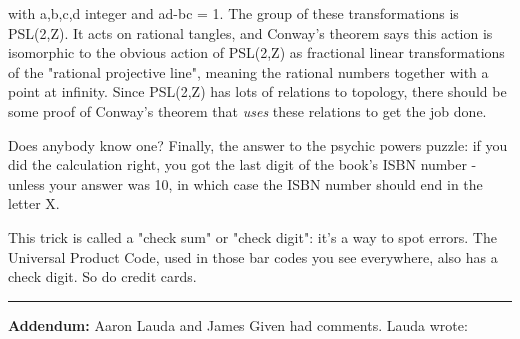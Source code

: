 with a,b,c,d integer and ad-bc = 1.  The group of these transformations
is PSL(2,Z).  It acts on rational tangles, and Conway's theorem says
this action is isomorphic to the obvious action of PSL(2,Z) as fractional
linear transformations of the "rational projective line", 
meaning the rational 
numbers together with a point at infinity.  Since PSL(2,Z) has lots of 
relations to topology, there should be some proof of Conway's theorem
that \emph{uses} these relations to get the job done.

Does anybody know one?
Finally, the answer to the psychic powers puzzle: if you did the 
calculation right, you got the last digit of the book's ISBN number - 
unless your answer was 10, in which case the ISBN number should end 
in the letter X.

This trick is called a "check sum" or "check digit": 
it's a way to spot 
errors.  The Universal Product Code, used in those bar codes you see
everywhere, also has a check digit.  So do credit cards.  

\par\noindent\rule{\textwidth}{0.4pt}
\textbf{Addendum:}  
Aaron Lauda and James Given had comments.  Lauda wrote:



